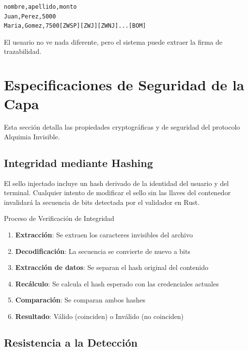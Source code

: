 \begin{verbatim}
nombre,apellido,monto
Juan,Perez,5000
Maria,Gomez,7500[ZWSP][ZWJ][ZWNJ]...[BOM]
\end{verbatim}

El usuario no ve nada diferente, pero el sistema puede extraer la firma de trazabilidad.

\section{Especificaciones de Seguridad de la Capa}
\label{sec:ai-especificaciones}

Esta sección detalla las propiedades cryptográficas y de seguridad del protocolo Alquimia Invisible.

\subsection{Integridad mediante Hashing}

El sello injectado incluye un hash derivado de la identidad del usuario y del terminal. Cualquier intento de modificar el sello sin las llaves del contenedor invalidará la secuencia de bits detectada por el validador en Rust.


\begin{caja}{Proceso de Verificación de Integridad}
\begin{enumerate}
\item \textbf{Extracción}: Se extraen los caracteres invisibles del archivo
\item \textbf{Decodificación}: La secuencia se convierte de nuevo a bits
\item \textbf{Extracción de datos}: Se separan el hash original del contenido
\item \textbf{Recálculo}: Se calcula el hash esperado con las credenciales actuales
\item \textbf{Comparación}: Se comparan ambos hashes
\item \textbf{Resultado}: Válido (coinciden) o Inválido (no coinciden)
\end{enumerate}
\end{caja}

\subsection{Resistencia a la Detección}

